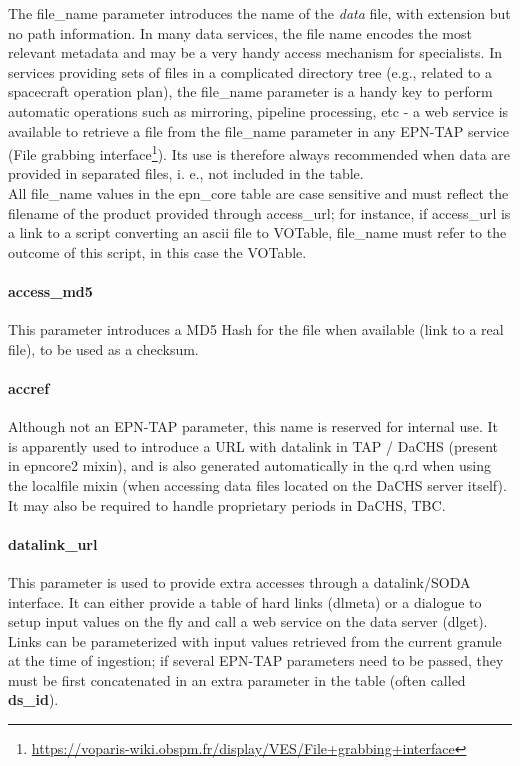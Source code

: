 \documentclass[11pt,a4paper]{ivoa}
\begin{document}
The file\_name parameter introduces the name of the \emph{data} file, with extension but no path information. In many data services, the file name encodes the most relevant metadata and may be a very handy access mechanism for specialists. In services providing sets of files in a complicated directory tree (e.g., related to a spacecraft operation plan), the file\_name parameter is a handy key to perform automatic operations such as mirroring, pipeline processing, etc - a web service is available to retrieve a file from the file\_name parameter in any EPN-TAP service (File grabbing interface\footnote{\url{https://voparis-wiki.obspm.fr/display/VES/File+grabbing+interface}}). Its use is therefore always recommended when data are provided in separated files, i. e., not included in the table.\\All file\_name values in the epn\_core table are case sensitive and must reflect the filename of the product provided through access\_url; for instance, if access\_url is a link to a script converting an ascii file to VOTable, file\_name must refer to the outcome of this script, in this case the VOTable.

\paragraph{access\_md5}

This parameter introduces a MD5 Hash for the file when available (link to a real file), to be used as a checksum.\\

\paragraph{accref}

Although not an EPN-TAP parameter, this name is reserved for internal use. It is apparently used to introduce a URL with datalink in TAP / DaCHS (present in epncore2 mixin), and is also generated automatically in the q.rd when using the localfile mixin (when accessing data files located on the DaCHS server itself). It may also be required to handle proprietary periods in DaCHS, TBC. \\

\paragraph{datalink\_url}

This parameter is used to provide extra accesses through a datalink/SODA interface. It can either provide a table of hard links (dlmeta) or a dialogue to setup input values on the fly and  call a web service on the data server (dlget). Links can be parameterized with input values retrieved from the current granule at the time of ingestion; if several EPN-TAP parameters need to be passed, they must be first concatenated in an extra parameter in the table (often called \textbf{ds\_id}).
\end{document}
